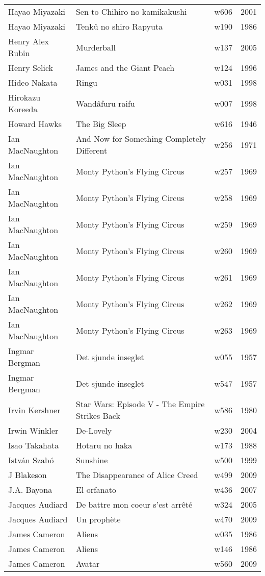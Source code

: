 \documentclass{article}
\begin{document}
\begin {center}
\begin{longtable}{l p{10cm} l l}
Hayao Miyazaki & Sen to Chihiro no kamikakushi & w606 & 2001 \\
Hayao Miyazaki & Tenkû no shiro Rapyuta & w190 & 1986 \\
Henry Alex Rubin & Murderball & w137 & 2005 \\
Henry Selick & James and the Giant Peach & w124 & 1996 \\
Hideo Nakata & Ringu & w031 & 1998 \\
Hirokazu Koreeda & Wandâfuru raifu & w007 & 1998 \\
Howard Hawks & The Big Sleep & w616 & 1946 \\
Ian MacNaughton & And Now for Something Completely Different & w256 & 1971 \\
Ian MacNaughton & Monty Python's Flying Circus & w257 & 1969 \\
Ian MacNaughton & Monty Python's Flying Circus & w258 & 1969 \\
Ian MacNaughton & Monty Python's Flying Circus & w259 & 1969 \\
Ian MacNaughton & Monty Python's Flying Circus & w260 & 1969 \\
Ian MacNaughton & Monty Python's Flying Circus & w261 & 1969 \\
Ian MacNaughton & Monty Python's Flying Circus & w262 & 1969 \\
Ian MacNaughton & Monty Python's Flying Circus & w263 & 1969 \\
Ingmar Bergman & Det sjunde inseglet & w055 & 1957 \\
Ingmar Bergman & Det sjunde inseglet & w547 & 1957 \\
Irvin Kershner & Star Wars: Episode V - The Empire Strikes Back & w586 & 1980 \\
Irwin Winkler & De-Lovely & w230 & 2004 \\
Isao Takahata & Hotaru no haka & w173 & 1988 \\
István Szabó & Sunshine & w500 & 1999 \\
J Blakeson & The Disappearance of Alice Creed & w499 & 2009 \\
J.A. Bayona & El orfanato & w436 & 2007 \\
Jacques Audiard & De battre mon coeur s'est arrêté & w324 & 2005 \\
Jacques Audiard & Un prophète & w470 & 2009 \\
James Cameron & Aliens & w035 & 1986 \\
James Cameron & Aliens & w146 & 1986 \\
James Cameron & Avatar & w560 & 2009 \\

\end{longtable}
\end{center}
\end{document}
